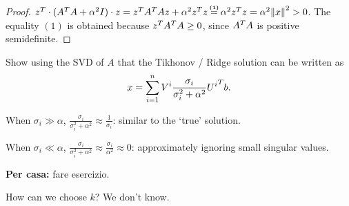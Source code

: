 \documentclass[computational_mathematics.tex]{subfiles}
\begin{document}
\begin{proof}
  $\tr{z} \cdot (\tr{A}A + \alpha^2 I) \cdot z = \tr{z}\tr{A}Az + \alpha^2 \tr{z} z  \numeq{(1)} \alpha^2 \tr{z} z = \alpha^2 \sqrnorm{x} > 0$. The equality $(1)$ is obtained because ${z}^{T}{A}^{T}A \ge 0$, since ${A}^{T}A$ is positive semidefinite. 
\end{proof}

\begin{exe}
Show using the SVD of $A$ that the Tikhonov / Ridge solution can be written as
\[
  x = \sum\limits_{i=1}^n V^i \frac{\sigma_i}{\sigma_i^2+\alpha^2} {U^i}^{T} b.
\]

When $\sigma_i \gg \alpha$, $\frac{\sigma_i}{\sigma_i^2+\alpha^2} \approx \frac{1}{\sigma_i}$: similar to the `true' solution.

When $\sigma_i \ll \alpha$, $\frac{\sigma_i}{\sigma_i^2+\alpha^2} \approx \frac{\sigma_i}{\alpha^2} \approx 0$: approximately ignoring small singular values.
\end{exe}
\textbf{Per casa:} fare esercizio.

How can we choose $k$? We don't know.
\end{document}
